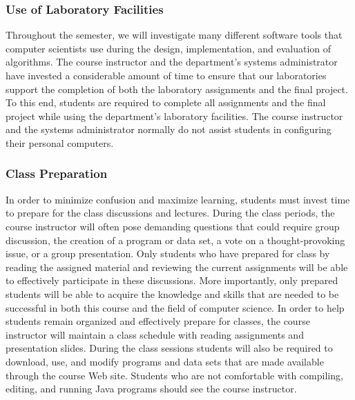 \subsubsection*{Use of Laboratory Facilities}

Throughout the semester, we will investigate many different software tools that computer scientists use during the
design, implementation, and evaluation of algorithms.  The course instructor and the department's systems administrator
have invested a considerable amount of time to ensure that our laboratories support the completion of both the
laboratory assignments and the final project.  To this end, students are required to complete all assignments and the
final project while using the department's laboratory facilities. The course instructor and the systems administrator
normally do not assist students in configuring their personal computers.

\subsubsection*{Class Preparation}

% 

In order to minimize confusion and maximize learning, students must invest time to prepare for the class discussions and
lectures.  During the class periods, the course instructor will often pose demanding questions that could require group
discussion, the creation of a program or data set, a vote on a thought-provoking issue, or a group presentation.  Only
students who have prepared for class by reading the assigned material and reviewing the current assignments will be able
to effectively participate in these discussions.  More importantly, only prepared students will be able to acquire the
knowledge and skills that are needed to be successful in both this course and the field of computer science.  In order
to help students remain organized and effectively prepare for classes, the course instructor will maintain a class
schedule with reading assignments and presentation slides.   During the class sessions students will also be required to
download, use, and modify programs and data sets that are made available through the course Web site.  Students who are
not comfortable with compiling, editing, and running Java programs should see the course instructor.


